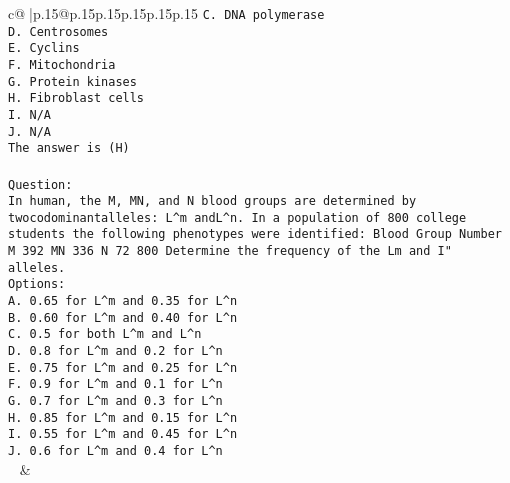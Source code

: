 \documentclass{article}
\begin{document}
{\begin{supertabular}{c@{$\;$}|p{.15\linewidth}@{}p{.15\linewidth}p{.15\linewidth}p{.15\linewidth}p{.15\linewidth}p{.15\linewidth}}
{{{\tt C. DNA polymerase\\ \tt D. Centrosomes\\ \tt E. Cyclins\\ \tt F. Mitochondria\\ \tt G. Protein kinases\\ \tt H. Fibroblast cells\\ \tt I. N/A\\ \tt J. N/A\\ \tt The answer is (H)\\ \tt \\ \tt Question:\\ \tt In human, the M, MN, and N blood groups are determined by twocodominantalleles: L^m andL^n. In a population of 800 college students the following phenotypes were identified: Blood Group Number M 392 MN 336 N 72 800 Determine the frequency of the Lm and I" alleles.\\ \tt Options:\\ \tt A. 0.65 for L^m and 0.35 for L^n\\ \tt B. 0.60 for L^m and 0.40 for L^n\\ \tt C. 0.5 for both L^m and L^n\\ \tt D. 0.8 for L^m and 0.2 for L^n\\ \tt E. 0.75 for L^m and 0.25 for L^n\\ \tt F. 0.9 for L^m and 0.1 for L^n\\ \tt G. 0.7 for L^m and 0.3 for L^n\\ \tt H. 0.85 for L^m and 0.15 for L^n\\ \tt I. 0.55 for L^m and 0.45 for L^n\\ \tt J. 0.6 for L^m and 0.4 for L^n\\ \tt  
	  } 
	   } 
	   } 
	 & \\ 
 

    \theutterance {}  


\end{supertabular}}
\end{document}
